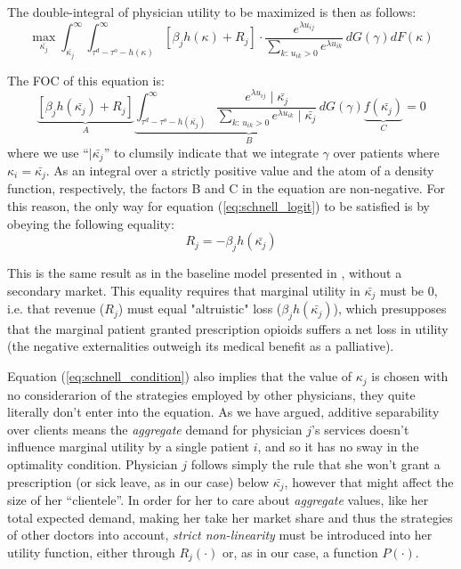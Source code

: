 \documentclass[../main.tex]{subfiles}
\begin{document}
The double-integral of physician utility to be maximized is then as follows:
\[
\max_{\bar{\kappa_j}}\int_{\bar{\kappa_j}}^{\infty} \int_{\tau^d - \tau^o - h(\kappa)}^{\infty} [\beta_j h(\kappa) + R_j] \cdot \frac{e^{\lambda u_{ij}}}{\sum \limits_{k : \, u_{ik} > 0} e^{\lambda u_{ik}}} \, dG(\gamma) dF(\kappa)
\]

The FOC of this equation is:
\begin{equation}
    \underbrace{[\beta_j h(\bar{\kappa_j}) + R_j]}_{A}\underbrace{\int_{\tau^d - \tau^o - h(\bar{\kappa_j})}^{\infty} \frac{e^{\lambda u_{ij}} \mid \bar{\kappa_j}}{\sum \limits_{k : \, u_{ik} > 0} e^{\lambda u_{ik}} \mid \bar{\kappa_j}} \, dG(\gamma)}_{B} \underbrace{f(\bar{\kappa_j})}_{C} = 0 
\label{eq:schnell_logit}
\end{equation}
where we use ``$\mid \bar{\kappa_j}$'' to clumsily indicate that we integrate $\gamma$ over patients where $\kappa_i = \bar{\kappa_j}$. As an integral over a strictly positive value and the atom of a density function, respectively, the factors B and C in the equation are non-negative. For this reason, the only way for equation (\ref{eq:schnell_logit}) to be satisfied is by obeying the following equality:
\begin{equation}
    R_j = - \beta_j h(\bar{\kappa_j})
    \label{eq:schnell_condition}
\end{equation}

This is the same result as in the baseline model presented in \cite{schnell2017physician}, without a secondary market. This equality requires that marginal utility in $\bar{\kappa_j}$ must be $0$, i.e. that revenue ($R_j$) must equal "altruistic" loss ($\beta_j h(\bar{\kappa_j})$), which presupposes that the marginal patient granted prescription opioids suffers a net loss in utility (the negative externalities outweigh its medical benefit as a palliative).

Equation (\ref{eq:schnell_condition}) also implies that the value of  $\kappa_j$ is chosen with no considerarion of the strategies employed by other physicians, they quite literally don't enter into the equation. As we have argued, additive separability over clients means the \textit{aggregate} demand for physician $j$'s services doesn't influence marginal utility by a single patient $i$, and so it has no sway in the optimality condition. Physician $j$ follows simply the rule that she won't grant a prescription (or sick leave, as in our case) below $\bar{\kappa_j}$, however that might affect the size of her ``clientele''. In order for her to care about \textit{aggregate} values, like her total expected demand, making her take her market share and thus the strategies of other doctors into account, \textit{strict non-linearity} must be introduced into her utility function, either through $R_j(\cdot)$ or, as in our case, a function $P(\cdot)$.
\end{document}
